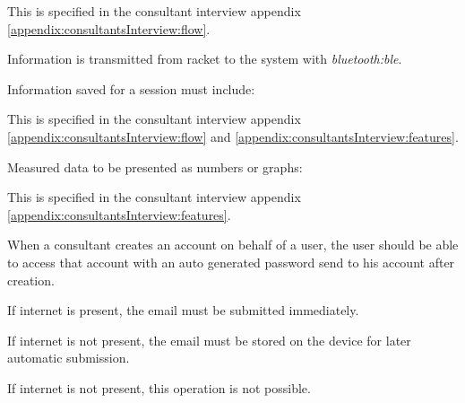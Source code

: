 
This  is specified in the consultant interview appendix \ref{appendix:consultantsInterview:flow}.

Information is transmitted from racket to the system with \textit{\gls{bluetooth:ble}}. 

Information saved for a session must include: \newline
{}


This  is specified in the consultant interview appendix \ref{appendix:consultantsInterview:flow} and \ref{appendix:consultantsInterview:features}.

Measured data to be presented as numbers or graphs: \newline
{}


This  is specified in the consultant interview appendix \ref{appendix:consultantsInterview:features}.

When a consultant creates an account on behalf of a user, the user should be able to access that account with an auto generated password send to his account after creation.

If internet is present, the email must be submitted immediately.

If internet is not present, the email must be stored on the device for later automatic submission.


If internet is not present, this operation is not possible.


